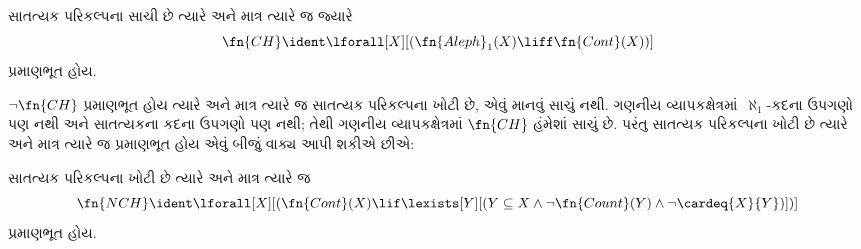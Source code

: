 \begin{prop}
સાતત્યક પરિકલ્પના સાચી છે ત્યારે અને માત્ર ત્યારે જ જ્યારે
\[\fn{CH} \ident
\lforall[X][(\fn{Aleph}_1(X) \liff \fn{Cont}(X))]\]
પ્રમાણભૂત હોય.
\end{prop}

$\lnot \fn{CH}$ પ્રમાણભૂત હોય ત્યારે અને માત્ર ત્યારે જ સાતત્યક
પરિકલ્પના ખોટી છે, એવું માનવું સાચું નથી. ગણનીય
વ્યાપકક્ષેત્રમાં~$\aleph_1$-કદના ઉપગણો પણ નથી અને સાતત્યકના
કદના ઉપગણો પણ નથી; તેથી ગણનીય વ્યાપકક્ષેત્રમાં
$\fn{CH}$ હંમેશાં સાચું છે.
પરંતુ સાતત્યક પરિકલ્પના ખોટી છે ત્યારે અને માત્ર ત્યારે જ પ્રમાણભૂત
હોય એવું બીજું વાક્ય આપી શકીએ છીએ:

\begin{prop}
સાતત્યક પરિકલ્પના ખોટી છે ત્યારે અને માત્ર ત્યારે જ
\[\fn{NCH} \ident
\lforall[X][(\fn{Cont}(X) \lif \lexists[Y][(Y \subseteq X \land \lnot
    \fn{Count}(Y) \land \lnot \cardeq{X}{Y})])]\]
પ્રમાણભૂત હોય.
\end{prop}
